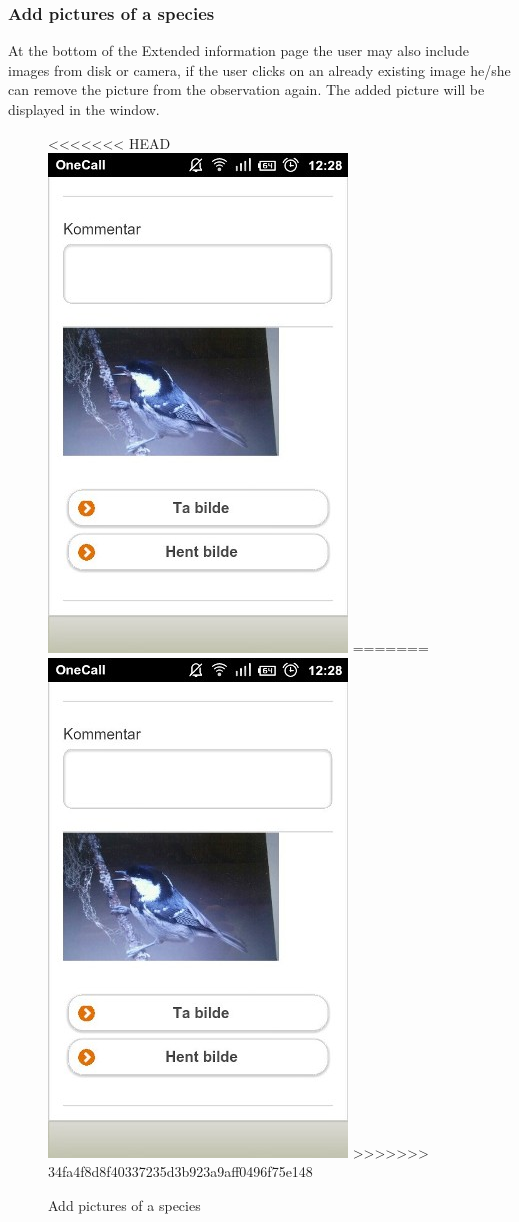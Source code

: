 \pagebreak


\subsubsection{Add pictures of a species}
At the bottom of the Extended information page the user may also include images from disk or camera, if the user clicks on an already existing image he/she can remove the picture from the observation again. The added picture will be displayed in the window.

\begin{figure}[h!]
\centering
<<<<<<< HEAD
 \includegraphics[scale=0.9]{appendix/pic/bilde.jpg}
=======
 \includegraphics[height=0.9\textwidth]{appendix/pic/bilde.jpg} 
>>>>>>> 34fa4f8d8f40337235d3b923a9aff0496f75e148
 \caption{Add pictures of a species}
 \end{figure}

